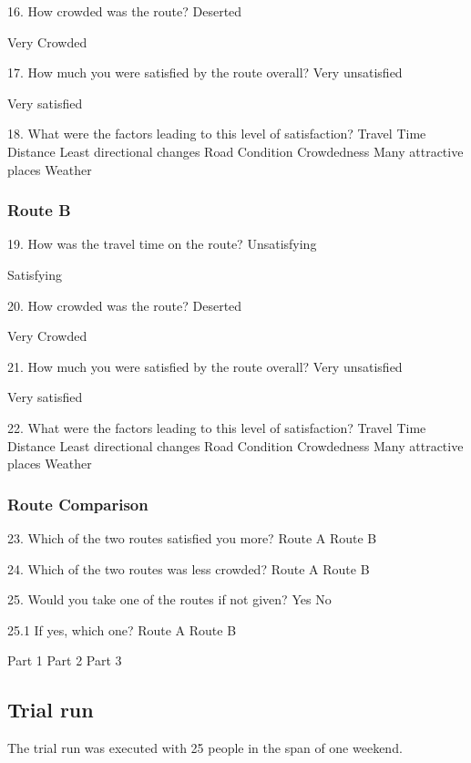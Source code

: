 16. How crowded was the route?
Deserted



Very Crowded

17. How much you were satisfied by the route overall? 
Very unsatisfied



Very satisfied

18. What were the factors leading to this level of satisfaction?
Travel Time
Distance
Least directional changes
Road Condition
Crowdedness
Many attractive places
Weather

\subsubsection{Route B}

19. How was the travel time on the route? 
Unsatisfying



Satisfying

20. How crowded was the route?
Deserted



Very Crowded

21. How much you were satisfied by the route overall? 
Very unsatisfied



Very satisfied

22. What were the factors leading to this level of satisfaction?
Travel Time
Distance
Least directional changes
Road Condition
Crowdedness
Many attractive places
Weather

\subsubsection{Route Comparison}

23. Which of the two routes satisfied you more?
Route A
Route B

24. Which of the two routes was less crowded?
Route A
Route B

25. Would you take one of the routes if not given?
 Yes
 No

25.1 If yes, which one?
Route A
Route B


Part 1
Part 2
Part 3

\subsection{Trial run}

The trial run was executed with 25 people in the span of one weekend.

